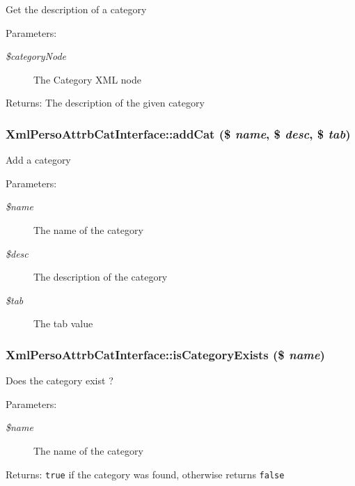 Get the description of a category

\begin{Desc}
\item[Parameters:]
\begin{description}
\item[{\em \$category\-Node}]The Category XML node\end{description}
\end{Desc}
\begin{Desc}
\item[Returns:]The description of the given category \end{Desc}
\subsubsection{\setlength{\rightskip}{0pt plus 5cm}Xml\-Perso\-Attrb\-Cat\-Interface::add\-Cat (\$ {\em name}, \$ {\em desc}, \$ {\em tab})}\label{classXmlPersoAttrbCatInterface_d04f102004ab751b12319102abcaafb2}


Add a category

\begin{Desc}
\item[Parameters:]
\begin{description}
\item[{\em \$name}]The name of the category \item[{\em \$desc}]The description of the category \item[{\em \$tab}]The tab value \end{description}
\end{Desc}
\subsubsection{\setlength{\rightskip}{0pt plus 5cm}Xml\-Perso\-Attrb\-Cat\-Interface::is\-Category\-Exists (\$ {\em name})}\label{classXmlPersoAttrbCatInterface_b52ff1aa1bd3e9452a59965e205859b2}


Does the category exist ?

\begin{Desc}
\item[Parameters:]
\begin{description}
\item[{\em \$name}]The name of the category\end{description}
\end{Desc}
\begin{Desc}
\item[Returns:]{\tt true} if the category was found, otherwise returns {\tt false} \end{Desc}
